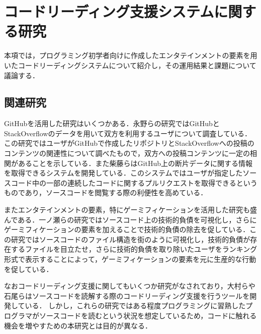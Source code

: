 \section{コードリーディング支援システムに関する研究}
本項では，プログラミング初学者向けに作成したエンタテインメントの要素を用いたコードリーディングシステムについて紹介し，その運用結果と課題について議論する．

\subsection{関連研究}

GitHubを活用した研究はいくつかある．永野らの研究\cite{nagano}ではGitHubとStackOverflowのデータを用いて双方を利用するユーザについて調査している．この研究ではユーザがGitHubで作成したリポジトリとStackOverflowへの投稿のコンテンツの関連性について調べたもので，双方への投稿コンテンツに一定の相関があることを示している．また柴藤らはGitHub上の断片データに関する情報を取得できるシステムを開発している\cite{shibatou}．このシステムではユーザが指定したソースコード中の一部の連続したコードに関するプルリクエストを取得できるというものであり，ソースコードを閲覧する際の利便性を高めている．

またエンタテインメントの要素，特にゲーミフィケーションを活用した研究も盛んである．一ノ瀬らの研究\cite{ichinose}ではソースコード上の技術的負債を可視化し，さらにゲーミフィケーションの要素を加えることで技術的負債の除去を促している．この研究ではソースコードのファイル構造を街のように可視化し，技術的負債が存在するファイルを目立たせ，さらに技術的負債を取り除いたユーザをランキング形式で表示することによって，ゲーミフィケーションの要素を元に生産的な行動を促している．

なおコードリーディング支援に関してもいくつか研究がなされており，大村らや石尾らはソースコードを読解する際のコードリーディング支援を行うツールを開発している\cite{omura}\cite{ishio}．
しかし，これらの研究ではある程度プログラミングに習熟したプログラマがソースコードを読むという状況を想定しているため，コードに触れる機会を増やすための本研究とは目的が異なる．

